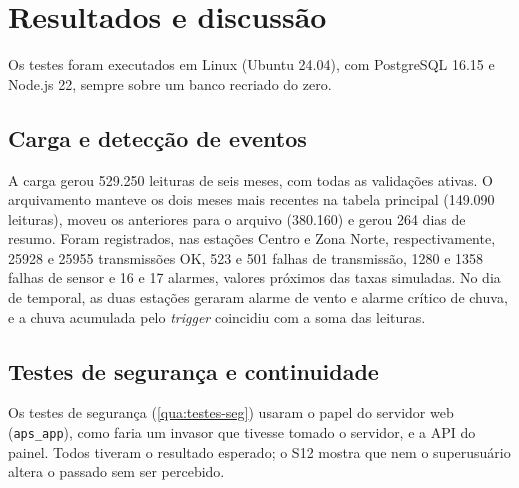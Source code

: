 \chapter{Resultados e discussão}\label{cap:resultados}

Os testes foram executados em Linux (Ubuntu 24.04), com PostgreSQL 16.15 e Node.js 22, sempre sobre um banco recriado do zero.

\section{Carga e detecção de eventos}

A carga gerou 529.250 leituras de seis meses, com todas as validações ativas. O arquivamento manteve os dois meses mais recentes na tabela principal (149.090 leituras), moveu os anteriores para o arquivo (380.160) e gerou 264 dias de resumo. Foram registrados, nas estações Centro e Zona Norte, respectivamente, \num{25928} e \num{25955} transmissões OK, 523 e 501 falhas de transmissão, \num{1280} e \num{1358} falhas de sensor e 16 e 17 alarmes, valores próximos das taxas simuladas. No dia de temporal, as duas estações geraram alarme de vento e alarme crítico de chuva, e a chuva acumulada pelo \textit{trigger} coincidiu com a soma das leituras.


\section{Testes de segurança e continuidade}

Os testes de segurança (\autoref{qua:testes-seg}) usaram o papel do servidor web (\texttt{aps\_app}), como faria um invasor que tivesse tomado o servidor, e a API do painel. Todos tiveram o resultado esperado; o S12 mostra que nem o superusuário altera o passado sem ser percebido.

